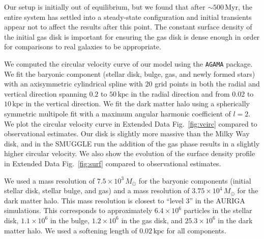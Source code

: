 \documentclass{natureprintstyle}
\begin{document}
Our setup is initially out of equilibrium, but we found that after
$\sim500\,\textrm{Myr}$, the entire system has settled into a steady-state
configuration and initial transients appear not to affect the results after
this point. The constant surface density of the initial gas disk is important
for ensuring the gas disk is dense enough in order for comparisons to real
galaxies to be appropriate.

We computed the circular velocity curve of our model using the \texttt{AGAMA}
package.\cite{2019MNRAS.482.1525V} We fit the baryonic component (stellar
disk, bulge, gas, and newly formed stars) with an axisymmetric cylindrical
spline with $20$ grid points in both the radial and vertical direction
spanning $0.2$ to $50\,\textrm{kpc}$ in the radial direction and from $0.02$
to $10\,\textrm{kpc}$ in the vertical direction. We fit the dark matter halo
using a spherically symmetric multipole fit with a maximum angular harmonic
coefficient of $l=2$. We plot the circular velocity curve in Extended Data
Fig.~\ref{fig:vcirc} compared to observational
estimates.\cite{2019ApJ...871..120E} Our disk is slightly more massive than
the Milky Way disk, and in the SMUGGLE run the addition of the gas phase
results in a slightly higher circular velocity. We also show the evolution of
the surface density profile in Extended Data Fig.~\ref{fig:surf} compared to
observational estimates.\cite{2012ARAA..50..531K}

We used a mass resolution of $7.5\times10^3\,M_{\odot}$ for the baryonic
components (initial stellar disk, stellar bulge, and gas) and a mass
resolution of $3.75\times10^4\,M_{\odot}$ for the dark matter halo. This mass
resolution is closest to ``level 3'' in the AURIGA
simulations.\cite{2017MNRAS.467..179G} This corresponds to approximately
$6.4\times10^6$ particles in the stellar disk, $1.1\times10^6$ in the bulge,
$1.2\times10^6$ in the gas disk, and $25.3\times10^6$ in the dark matter halo.
We used a softening length of $0.02\,\textrm{kpc}$ for all components.
\end{document}
